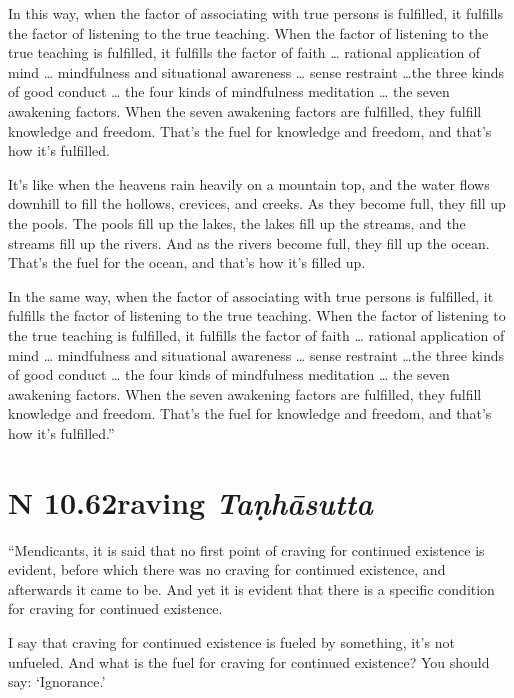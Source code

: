 \documentclass[12pt,openany]{book}%
\newcommand*{\suttatitleacronym}[1]{\smaller[2]{#1}\vspace*{.3em}}
\newcommand*{\suttatitletranslation}[1]{\linebreak{#1}}
\newcommand*{\suttatitleroot}[1]{\linebreak\smaller[2]\itshape{#1}}
\newcommand*{\tocacronym}[1]{\hspace*{-3.3em}{#1}\quad}
\newcommand*{\toctranslation}[1]{#1}
\newcommand*{\tocroot}[1]{(\textit{#1})}
\begin{document}
In this way, when the factor of associating with true persons is fulfilled, it fulfills the factor of listening to the true teaching. When the factor of listening to the true teaching is fulfilled, it fulfills the factor of faith … rational application of mind … mindfulness and situational awareness … sense restraint …the three kinds of good conduct … the four kinds of mindfulness meditation … the seven awakening factors. When the seven awakening factors are fulfilled, they fulfill knowledge and freedom. That’s the fuel for knowledge and freedom, and that’s how it’s fulfilled. 

It’s like when the heavens rain heavily on a mountain top, and the water flows downhill to fill the hollows, crevices, and creeks. As they become full, they fill up the pools. The pools fill up the lakes, the lakes fill up the streams, and the streams fill up the rivers. And as the rivers become full, they fill up the ocean. That’s the fuel for the ocean, and that’s how it’s filled up. 

In the same way, when the factor of associating with true persons is fulfilled, it fulfills the factor of listening to the true teaching. When the factor of listening to the true teaching is fulfilled, it fulfills the factor of faith … rational application of mind … mindfulness and situational awareness … sense restraint …the three kinds of good conduct … the four kinds of mindfulness meditation … the seven awakening factors. When the seven awakening factors are fulfilled, they fulfill knowledge and freedom. That’s the fuel for knowledge and freedom, and that’s how it’s fulfilled.” 

%
\section*{{\suttatitleacronym AN 10.62}{\suttatitletranslation Craving }{\suttatitleroot Taṇhāsutta}}
\addcontentsline{toc}{section}{\tocacronym{AN 10.62} \toctranslation{Craving } \tocroot{Taṇhāsutta}}

“Mendicants, it is said that no first point of craving for continued existence is evident, before which there was no craving for continued existence, and afterwards it came to be. And yet it is evident that there is a specific condition for craving for continued existence. 

I say that craving for continued existence is fueled by something, it’s not unfueled. And what is the fuel for craving for continued existence? You should say: ‘Ignorance.’ 
\end{document}
